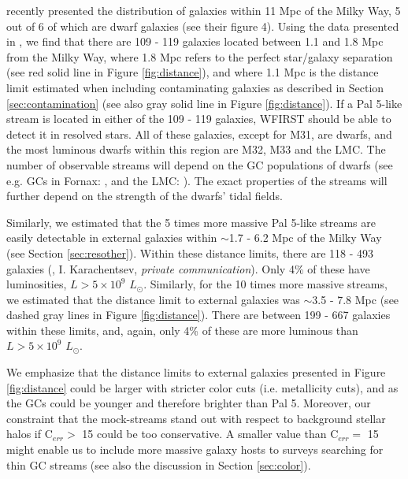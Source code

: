 \documentclass[twocolumn]{aastex62}
\begin{document}
\citet{kara19} recently presented the distribution of galaxies within 11 Mpc of the Milky Way, 5 out of 6 of which are dwarf galaxies (see their figure 4). Using the data presented in \citet{kara19}, we find that there are 109 - 119 galaxies located between 1.1 and 1.8 Mpc from the Milky Way, where 1.8 Mpc refers to the perfect star/galaxy separation (see red solid line in Figure \ref{fig:distance}), and where 1.1 Mpc is the distance limit estimated when including contaminating galaxies as described in Section \ref{sec:contamination} (see also gray solid line in Figure \ref{fig:distance}). If a Pal 5-like stream is located in either of the 109 - 119 galaxies, WFIRST should be able to detect it in resolved stars. All of these galaxies, except for M31, are dwarfs, and the most luminous dwarfs within this region are M32, M33 and the LMC. The number of observable streams will depend on the GC populations of dwarfs (see e.g. GCs in Fornax: \citealt{shapley38}, \citealt{hodge61a} and the LMC: \citealt{hodge61b}). The exact properties of the streams will further depend on the strength of the dwarfs' tidal fields. 

Similarly, we estimated that the 5 times more massive Pal 5-like streams are easily detectable in external galaxies within $\sim$1.7 - 6.2 Mpc of the Milky Way (see Section \ref{sec:resother}). 
Within these distance limits, there are 118 - 493 galaxies (\citealt{kara19}, I. Karachentsev, {\it private communication}). Only 4\% of these have luminosities, $L > 5 \times 10^9$ $L_{\odot}$. Similarly, for the 10 times more massive streams, we estimated that the distance limit to external galaxies was  $\sim$3.5 - 7.8 Mpc (see dashed gray lines in Figure \ref{fig:distance}). There are between 199 - 667 galaxies within these limits, and, again, only 4\% of these are more luminous than  $L > 5 \times 10^9$ $L_{\odot}$.

We emphasize that the distance limits to external galaxies presented in Figure \ref{fig:distance} could be larger with stricter color cuts (i.e. metallicity cuts), and as the GCs could be younger and therefore brighter than Pal 5.  Moreover, our constraint that the mock-streams stand out with respect to background stellar halos if C$_{err} >$ 15 could be too conservative. A smaller value than C$_{err} =$ 15 might enable us to include more massive galaxy hosts to surveys searching for thin GC streams (see also the discussion in Section \ref{sec:color}). 
\end{document}
